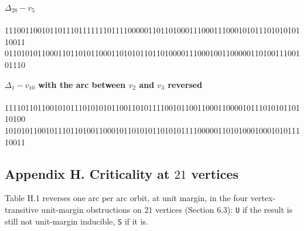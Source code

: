\documentclass[
]{article}
\begin{document}
\noindent

\begin{minipage}{\linewidth}
\textbf{$\Delta_{28} - v_{5}$}\\[2pt]
{\small{}\\
11100110010110111011111110111100000110110100011100011100010101110101010110011\\
01101010110001101101011000110101011011010000111000100110000011010011100101110}
\end{minipage}
\medskip

\noindent

\begin{minipage}{\linewidth}
\textbf{$\Delta_1 - v_{10}$ with the arc between $v_2$ and $v_3$ reversed}\\[2pt]
{\small{}\\
11110110110010101110101010110011010111100101100110001100001011101010110110100\\
10101011001011101101001100010110101011010101111000001101010001000101011110011}
\end{minipage}
\medskip

\setcounter{table}{0}\setcounter{figure}{0}

\subsection{\texorpdfstring{Appendix H. Criticality at \(21\)
vertices}{Appendix H. Criticality at 21 vertices}}\label{appendix-h.-criticality-at-21-vertices}

Table H.1 reverses one arc per arc orbit, at unit margin, in the four
vertex-transitive unit-margin obstructions on \(21\) vertices (Section
6.3): \texttt{U} if the result is still not unit-margin inducible,
\texttt{S} if it is.
\end{document}
